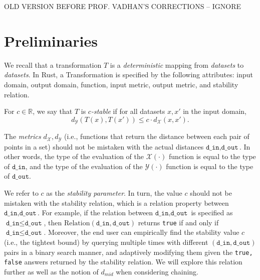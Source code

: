 \documentclass[11pt,a4paper]{article}
\theoremstyle{definition}
\newcommand{\R}{\mathbb{R}}
\newcommand{\din}{\texttt{d\_in}}
\newcommand{\dout}{\texttt{d\_out}}
\newcommand{\Relation}{\mathrm{Relation}}
\newcommand{\X}{\mathcal{X}}
\newcommand{\Y}{\mathcal{Y}}
\newcommand{\silvia}[1]{{ {\color{blue}{(silvia)~#1}}}}
\newcommand{\grace}[1]{{ {\color{purple}{(grace)~#1}}}}
\begin{document}
\silvia{Maybe add domain of $z$ below the sum?}



\newpage

OLD VERSION BEFORE PROF. VADHAN'S CORRECTIONS -- IGNORE

\section{Preliminaries}
We recall that a transformation $T$ is a \textit{deterministic} mapping from \textit{datasets} to \textit{datasets}. In Rust, a Transformation is specified by the following attributes: input domain, output domain, function, input metric, output metric, and stability relation.

For $c \in \R$, we say that $T$ is $c$\textit{-stable} if for all datasets $x, x'$ in the input domain,
\begin{equation}
    d_{\mathcal{Y}}(T(x), T(x')) \leq c \cdot d_{\mathcal{X}}(x, x').
\end{equation}

The \textit{metrics} $d_{\X}, d_{\Y}$ (i.e., functions that return the distance between each pair of points in a set) should not be mistaken with the actual distances $\din, \dout$. In other words, the type of the evaluation of the $\X(\cdot)$ function is equal to the type of $\din$, and the type of the evaluation of the $\Y(\cdot)$ function is equal to the type of $\dout$.


We refer to $c$ as the \textit{stability parameter}. In turn, the value $c$ should not be mistaken with the stability relation, which is a relation property between $\din, \dout$. For example, if the relation between $\din, \dout$ is specified as $\din \leq \dout$, then $\Relation(\din, \dout)$ returns \texttt{true} if and only if $\din \leq \dout$. Moreover, the end user can empirically find the stability value $c$ (i.e., the tightest bound) by querying multiple times with different $(\din, \dout)$ pairs in a binary search manner, and adaptively modifying them given the \texttt{true, false} answers returned by the stability relation. We will explore this relation further as well as the notion of $d_{mid}$ when considering chaining. 
\end{document}
